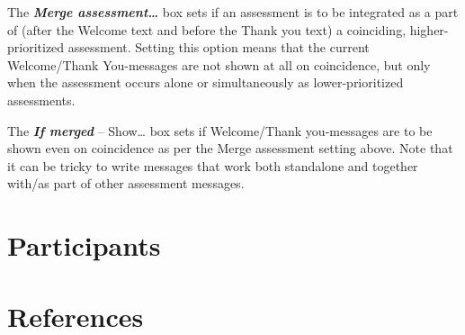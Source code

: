 \documentclass[]{book}
\begin{document}
The \textbf{\emph{Merge assessment\ldots{}}} box sets if an assessment is to be integrated as a part of (after the Welcome text and before the Thank you text) a coinciding, higher-prioritized assessment. Setting this option means that the current Welcome/Thank You-messages are not shown at all on coincidence, but only when the assessment occurs alone or simultaneously as lower-prioritized assessments.

The \textbf{\emph{If merged}} -- Show\ldots{} box sets if Welcome/Thank you-messages are to be shown even on coincidence as per the Merge assessment setting above. Note that it can be tricky to write messages that work both standalone and together with/as part of other assessment messages.

\hypertarget{participants}{%
\chapter{Participants}\label{participants}}

\hypertarget{references}{%
\chapter{References}\label{references}}


\end{document}
